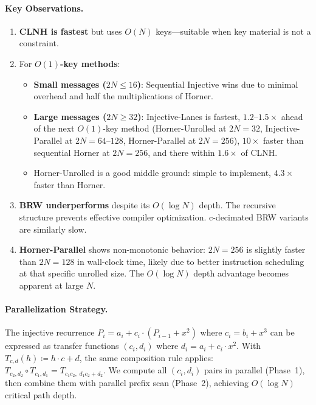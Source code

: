 \paragraph{Key Observations.}
\begin{enumerate}
    \item \textbf{CLNH is fastest} but uses $O(N)$ keys---suitable when key material is not a constraint.
    \item For \textbf{$O(1)$-key methods}:
    \begin{itemize}
        \item \textbf{Small messages ($2N \le 16$)}: Sequential Injective wins due to minimal overhead
              and half the multiplications of Horner.
        \item \textbf{Large messages ($2N \ge 32$)}: Injective-Lanes is fastest, $1.2$--$1.5\times$
              ahead of the next $O(1)$-key method (Horner-Unrolled at $2N=32$, Injective-Parallel
              at $2N=64$--$128$, Horner-Parallel at $2N=256$), $10\times$ faster than sequential
              Horner at $2N=256$, and there within $1.6\times$ of CLNH.
        \item Horner-Unrolled is a good middle ground: simple to implement, $4.3\times$ faster than Horner.
    \end{itemize}
    \item \textbf{BRW underperforms} despite its $O(\log N)$ depth.
          The recursive structure prevents effective compiler optimization.
          c-decimated BRW variants are similarly slow.
    \item \textbf{Horner-Parallel} shows non-monotonic behavior: $2N = 256$ is slightly faster than
          $2N = 128$ in wall-clock time, likely due to better instruction scheduling at that
          specific unrolled size. The $O(\log N)$ depth advantage becomes apparent at large $N$.
\end{enumerate}

\paragraph{Parallelization Strategy.}
The injective recurrence $P_i = a_i + c_i \cdot (P_{i-1} + x^2)$ where $c_i = b_i + x^3$
can be expressed as transfer functions $(c_i, d_i)$ where $d_i = a_i + c_i \cdot x^2$.
With $T_{c,d}(h)\coloneqq h\cdot c + d$, the same composition rule applies:
$T_{c_2,d_2}\!\circ T_{c_1,d_1} = T_{c_1c_2,\; d_1c_2 + d_2}$.
We compute all $(c_i, d_i)$ pairs in parallel (Phase~1), then combine them with
parallel prefix scan (Phase~2), achieving $O(\log N)$ critical path depth.

